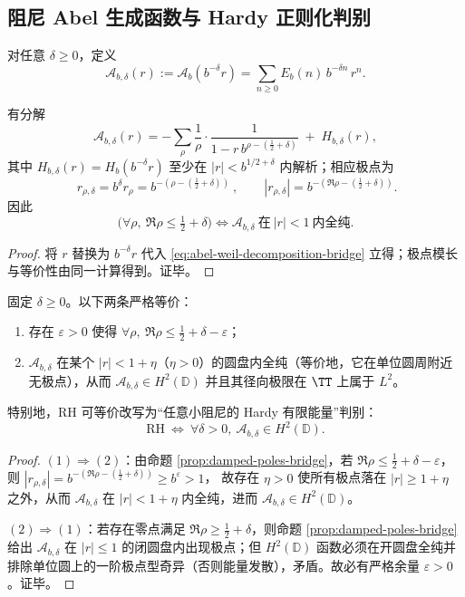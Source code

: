 \subsection{阻尼 Abel 生成函数与 Hardy 正则化判别}
\label{subsec:abel-damped-hardy}

\begin{definition}\label{def:abel-damped-bridge}
对任意 $\delta\ge 0$，定义
$$
\mathcal A_{b,\delta}(r):=\mathcal A_b(b^{-\delta}r)
=\sum_{n\ge 0}E_b(n)\,b^{-\delta n}\,r^n.
$$
\end{definition}

\begin{proposition}[阻尼后的极点位置]\label{prop:damped-poles-bridge}
有分解
$$
\mathcal A_{b,\delta}(r)
=-\sum_{\rho}\frac{1}{\rho}\cdot\frac{1}{1-r\,b^{\rho-(\frac12+\delta)}}\;+\;H_{b,\delta}(r),
$$
其中 $H_{b,\delta}(r)=H_b(b^{-\delta}r)$ 至少在 $|r|<b^{1/2+\delta}$ 内解析；相应极点为
$$
\boxed{\ r_{\rho,\delta}=b^{\delta}r_\rho=b^{-(\rho-(\frac12+\delta))}\ },
\qquad
|r_{\rho,\delta}|=b^{-(\Re\rho-(\frac12+\delta))}.
$$
因此
$$
\bigl(\forall\rho,\ \Re\rho\le\tfrac12+\delta\bigr)
\Longleftrightarrow
\mathcal A_{b,\delta}\ \text{在}\ |r|<1\ \text{内全纯}.
$$
\end{proposition}
\begin{proof}
将 $r$ 替换为 $b^{-\delta}r$ 代入 \eqref{eq:abel-weil-decomposition-bridge} 立得；极点模长与等价性由同一计算得到。证毕。
\end{proof}

\begin{theorem}\label{thm:hardy-criterion-delta-bridge}
固定 $\delta\ge 0$。以下两条严格等价：
\begin{enumerate}
  \item 存在 $\varepsilon>0$ 使得 $\forall\rho,\ \Re\rho\le \tfrac12+\delta-\varepsilon$；
  \item $\mathcal A_{b,\delta}$ 在某个 $|r|<1+\eta$（$\eta>0$）的圆盘内全纯（等价地，它在单位圆周附近无极点），从而 $\mathcal A_{b,\delta}\in H^2(\mathbb D)$ 并且其径向极限在 $\TT$ 上属于 $L^2$。
\end{enumerate}
特别地，RH 可等价改写为“任意小阻尼的 Hardy 有限能量”判别：
$$
\boxed{\ \mathrm{RH}\ \Longleftrightarrow\ \forall\delta>0,\ \mathcal A_{b,\delta}\in H^2(\mathbb D).\ }
$$
\end{theorem}
\begin{proof}
$(1)\Rightarrow(2)$：由命题 \ref{prop:damped-poles-bridge}，若 $\Re\rho\le\tfrac12+\delta-\varepsilon$，则
$
|r_{\rho,\delta}|=b^{-(\Re\rho-(\frac12+\delta))}\ge b^{\varepsilon}>1
$，
故存在 $\eta>0$ 使所有极点落在 $|r|\ge 1+\eta$ 之外，从而 $\mathcal A_{b,\delta}$ 在 $|r|<1+\eta$ 内全纯，进而 $\mathcal A_{b,\delta}\in H^2(\mathbb D)$。

$(2)\Rightarrow(1)$：若存在零点满足 $\Re\rho\ge \tfrac12+\delta$，则命题 \ref{prop:damped-poles-bridge} 给出 $\mathcal A_{b,\delta}$ 在 $|r|\le 1$ 的闭圆盘内出现极点；但 $H^2(\mathbb D)$ 函数必须在开圆盘全纯并排除单位圆上的一阶极点型奇异（否则能量发散），矛盾。故必有严格余量 $\varepsilon>0$。证毕。
\end{proof}

